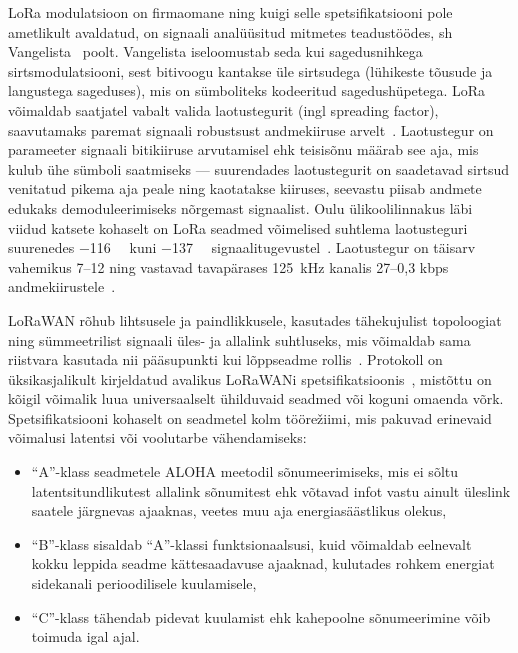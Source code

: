 \documentclass[12pt]{article}
\begin{document}
LoRa modulatsioon on firmaomane ning kuigi selle spetsifikatsiooni pole ametlikult avaldatud, on signaali analüüsitud mitmetes teadustöödes, sh Vangelista~\cite{vangelista} poolt.
Vangelista iseloomustab seda kui sagedusnihkega sirtsmodulatsiooni, sest bitivoogu kantakse üle sirtsudega (lühikeste tõusude ja langustega sageduses), mis on sümboliteks kodeeritud sagedushüpetega.
LoRa võimaldab saatjatel vabalt valida laotustegurit (ingl spreading factor), saavutamaks paremat signaali robustsust andmekiiruse arvelt~\cite{loramodulation}.
Laotustegur on parameeter signaali bitikiiruse arvutamisel ehk teisisõnu määrab see aja, mis kulub ühe sümboli saatmiseks — suurendades laotustegurit on saadetavad sirtsud venitatud pikema aja peale ning kaotatakse kiiruses, seevastu piisab andmete edukaks demoduleerimiseks nõrgemast signaalist.
Oulu ülikoolilinnakus läbi viidud katsete kohaselt on LoRa seadmed võimelised suhtlema laotusteguri suurenedes \SI{-116}{\deci\belm} kuni \SI{-137}{\deci\belm} signaalitugevustel~\cite{petajajarvi}.
Laotustegur on täisarv vahemikus 7--12 ning vastavad tavapärases \SI{125}{\kilo\hertz} kanalis 27--0,3 kbps andmekiirustele~\cite{adelanto}.

LoRaWAN rõhub lihtsusele ja paindlikkusele, kasutades tähekujulist topoloogiat ning sümmeetrilist signaali üles- ja allalink suhtluseks, mis võimaldab sama riistvara kasutada nii pääsupunkti kui lõppseadme rollis~\cite{lorawanIntro}.
Protokoll on üksikasjalikult kirjeldatud avalikus LoRaWANi spetsifikatsioonis~\cite{lorawanspec}, mistõttu on kõigil võimalik luua universaalselt ühilduvaid seadmed või koguni omaenda võrk.
Spetsifikatsiooni kohaselt on seadmetel kolm töörežiimi, mis pakuvad erinevaid võimalusi latentsi või voolutarbe vähendamiseks:
\begin{itemize}
    \item “A”-klass seadmetele ALOHA meetodil sõnumeerimiseks, mis ei sõltu latentsitundlikutest allalink sõnumitest ehk võtavad infot vastu ainult üleslink saatele järgnevas ajaaknas, veetes muu aja energiasäästlikus olekus,
    \item “B”-klass sisaldab “A”-klassi funktsionaalsusi, kuid võimaldab eelnevalt kokku leppida seadme kättesaadavuse ajaaknad, kulutades rohkem energiat sidekanali perioodilisele kuulamisele,
    \item “C”-klass tähendab pidevat kuulamist ehk kahepoolne sõnumeerimine võib toimuda igal ajal.
\end{itemize}
\end{document}
